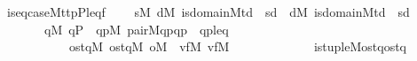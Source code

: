 \begin{isabellebody}
\ \ {\isachardoublequoteopen}is{\isacharunderscore}{\kern0pt}eq{\isacharunderscore}{\kern0pt}case{\isacharparenleft}{\kern0pt}M{\isacharcomma}{\kern0pt}t{}{\isacharcomma}{\kern0pt}t{}{\isacharcomma}{\kern0pt}p{\isacharcomma}{\kern0pt}P{\isacharcomma}{\kern0pt}leq{\isacharcomma}{\kern0pt}f{\isacharparenright}{\kern0pt}\ {\isasymequiv}\isanewline
\ \ \ {\isasymforall}s{\isacharbrackleft}{\kern0pt}M{\isacharbrackright}{\kern0pt}{\isachardot}{\kern0pt}\ {\isacharparenleft}{\kern0pt}{\isasymexists}d{\isacharbrackleft}{\kern0pt}M{\isacharbrackright}{\kern0pt}{\isachardot}{\kern0pt}\ is{\isacharunderscore}{\kern0pt}domain{\isacharparenleft}{\kern0pt}M{\isacharcomma}{\kern0pt}t{}{\isacharcomma}{\kern0pt}d{\isacharparenright}{\kern0pt}\ {\isasymand}\ s{\isasymin}d{\isacharparenright}{\kern0pt}\ {\isasymor}\ {\isacharparenleft}{\kern0pt}{\isasymexists}d{\isacharbrackleft}{\kern0pt}M{\isacharbrackright}{\kern0pt}{\isachardot}{\kern0pt}\ is{\isacharunderscore}{\kern0pt}domain{\isacharparenleft}{\kern0pt}M{\isacharcomma}{\kern0pt}t{}{\isacharcomma}{\kern0pt}d{\isacharparenright}{\kern0pt}\ {\isasymand}\ s{\isasymin}d{\isacharparenright}{\kern0pt}\isanewline
\ \ \ \ \ \ \ {\isasymlongrightarrow}\ {\isacharparenleft}{\kern0pt}{\isasymforall}q{\isacharbrackleft}{\kern0pt}M{\isacharbrackright}{\kern0pt}{\isachardot}{\kern0pt}\ q{\isasymin}P\ {\isasymand}\ {\isacharparenleft}{\kern0pt}{\isasymexists}qp{\isacharbrackleft}{\kern0pt}M{\isacharbrackright}{\kern0pt}{\isachardot}{\kern0pt}\ pair{\isacharparenleft}{\kern0pt}M{\isacharcomma}{\kern0pt}q{\isacharcomma}{\kern0pt}p{\isacharcomma}{\kern0pt}qp{\isacharparenright}{\kern0pt}\ {\isasymand}\ qp{\isasymin}leq{\isacharparenright}{\kern0pt}\ {\isasymlongrightarrow}\isanewline
\ \ \ \ \ \ \ \ \ \ \ \ {\isacharparenleft}{\kern0pt}{\isasymexists}ost{}q{\isacharbrackleft}{\kern0pt}M{\isacharbrackright}{\kern0pt}{\isachardot}{\kern0pt}\ {\isasymexists}ost{}q{\isacharbrackleft}{\kern0pt}M{\isacharbrackright}{\kern0pt}{\isachardot}{\kern0pt}\ {\isasymexists}o{\isacharbrackleft}{\kern0pt}M{\isacharbrackright}{\kern0pt}{\isachardot}{\kern0pt}\ \ {\isasymexists}vf{}{\isacharbrackleft}{\kern0pt}M{\isacharbrackright}{\kern0pt}{\isachardot}{\kern0pt}\ {\isasymexists}vf{}{\isacharbrackleft}{\kern0pt}M{\isacharbrackright}{\kern0pt}{\isachardot}{\kern0pt}\isanewline
\ \ \ \ \ \ \ \ \ \ \ \ \ is{\isacharunderscore}{\kern0pt}tuple{\isacharparenleft}{\kern0pt}M{\isacharcomma}{\kern0pt}o{\isacharcomma}{\kern0pt}s{\isacharcomma}{\kern0pt}t{}{\isacharcomma}{\kern0pt}q{\isacharcomma}{\kern0pt}ost{}q{\isacharparenright}{\kern0pt}\ {\isasymand}\isanewline

\end{isabellebody}
